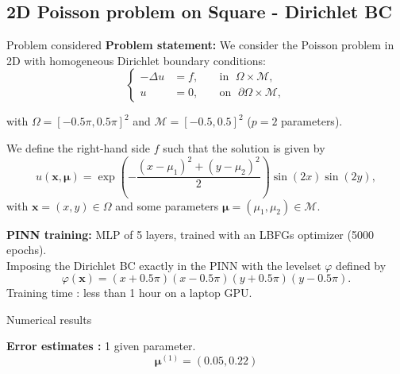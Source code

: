 \subsection{2D Poisson problem on Square - Dirichlet BC}

\begin{frame}{Problem considered} 
	\textbf{Problem statement:} We consider the Poisson problem in 2D with homogeneous Dirichlet boundary conditions:
	\vspace{-5pt}
	\begin{equation*}
		\left\{
		\begin{aligned}
			-\Delta u & = f, \; &  & \text{in } \; \Omega \times \mathcal{M}, \\
			u         & =0, \;  &  & \text{on } \; \partial\Omega \times \mathcal{M},
		\end{aligned}
		\right.
	\end{equation*}

	\vspace{-5pt}
	with $\Omega=[-0.5 \pi, 0.5 \pi]^2$ and $\mathcal{M}=[-0.5,0.5]^2$ ($p=2$ parameters).
		
	\vspace{8pt}
	We define the right-hand side $f$ such that the solution is given by
	\vspace{-5pt}
	\begin{equation*}
		u(\bm{x},\bm{\mu})=\exp\left(-\frac{(x-\mu_1)^2+(y-\mu_2)^2}{2}\right)\sin(2 x)\sin(2 y),
	\end{equation*}
	\vspace{-5pt}
	with $\bm{x}=(x,y)\in\Omega$ and some parameters $\bm{\mu}=(\mu_1,\mu_2) \in \mathcal{M}$.

	\vspace{12pt}
	\textbf{PINN training:} MLP of 5 layers, trained with an LBFGs optimizer (5000 epochs). \\
	Imposing the Dirichlet BC exactly in the PINN with the levelset $\varphi$ defined by
	$$\varphi(\bm{x})=(x+0.5\pi)(x-0.5\pi)(y+0.5\pi)(y-0.5\pi).$$
	\small\vspace{10pt}
	Training time : less than 1 hour on a laptop GPU.
\end{frame}

\begin{frame}{Numerical results}
	\hspace{-5pt}\begin{minipage}[t]{0.46\linewidth}
		\textbf{Error estimates :} 1 given parameter.
		$$\bm{\mu}^{(1)}=(0.05, 0.22) $$
		\vspace{-35pt}
		\begin{figure}[H]
		\end{figure}
	\end{minipage} \qquad \small
	\begin{minipage}[t]{0.48\linewidth}
	\end{minipage}
\end{frame}

